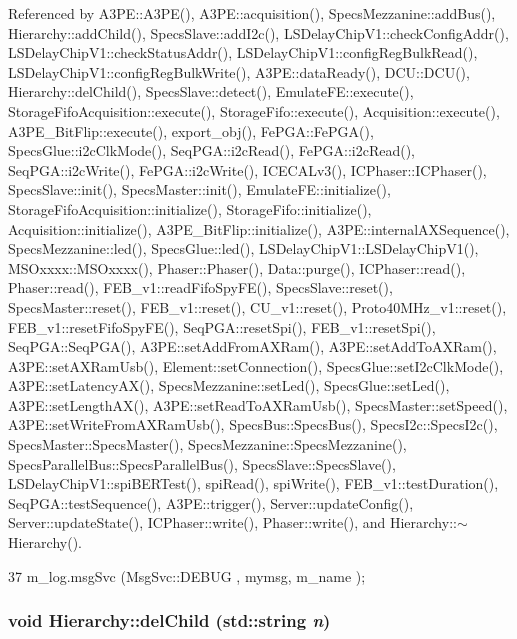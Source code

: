 Referenced by A3PE::A3PE(), A3PE::acquisition(), SpecsMezzanine::addBus(), Hierarchy::addChild(), SpecsSlave::addI2c(), LSDelayChipV1::checkConfigAddr(), LSDelayChipV1::checkStatusAddr(), LSDelayChipV1::configRegBulkRead(), LSDelayChipV1::configRegBulkWrite(), A3PE::dataReady(), DCU::DCU(), Hierarchy::delChild(), SpecsSlave::detect(), EmulateFE::execute(), StorageFifoAcquisition::execute(), StorageFifo::execute(), Acquisition::execute(), A3PE\_\-BitFlip::execute(), export\_\-obj(), FePGA::FePGA(), SpecsGlue::i2cClkMode(), SeqPGA::i2cRead(), FePGA::i2cRead(), SeqPGA::i2cWrite(), FePGA::i2cWrite(), ICECALv3(), ICPhaser::ICPhaser(), SpecsSlave::init(), SpecsMaster::init(), EmulateFE::initialize(), StorageFifoAcquisition::initialize(), StorageFifo::initialize(), Acquisition::initialize(), A3PE\_\-BitFlip::initialize(), A3PE::internalAXSequence(), SpecsMezzanine::led(), SpecsGlue::led(), LSDelayChipV1::LSDelayChipV1(), MSOxxxx::MSOxxxx(), Phaser::Phaser(), Data::purge(), ICPhaser::read(), Phaser::read(), FEB\_\-v1::readFifoSpyFE(), SpecsSlave::reset(), SpecsMaster::reset(), FEB\_\-v1::reset(), CU\_\-v1::reset(), Proto40MHz\_\-v1::reset(), FEB\_\-v1::resetFifoSpyFE(), SeqPGA::resetSpi(), FEB\_\-v1::resetSpi(), SeqPGA::SeqPGA(), A3PE::setAddFromAXRam(), A3PE::setAddToAXRam(), A3PE::setAXRamUsb(), Element::setConnection(), SpecsGlue::setI2cClkMode(), A3PE::setLatencyAX(), SpecsMezzanine::setLed(), SpecsGlue::setLed(), A3PE::setLengthAX(), A3PE::setReadToAXRamUsb(), SpecsMaster::setSpeed(), A3PE::setWriteFromAXRamUsb(), SpecsBus::SpecsBus(), SpecsI2c::SpecsI2c(), SpecsMaster::SpecsMaster(), SpecsMezzanine::SpecsMezzanine(), SpecsParallelBus::SpecsParallelBus(), SpecsSlave::SpecsSlave(), LSDelayChipV1::spiBERTest(), spiRead(), spiWrite(), FEB\_\-v1::testDuration(), SeqPGA::testSequence(), A3PE::trigger(), Server::updateConfig(), Server::updateState(), ICPhaser::write(), Phaser::write(), and Hierarchy::$\sim$Hierarchy().


\begin{DoxyCode}
37 { m_log.msgSvc (MsgSvc::DEBUG   , mymsg, m_name ); }
\end{DoxyCode}
\hypertarget{classHierarchy_a1928ac7615fe0b5e55cd707f70dc6781}{
\subsubsection[{delChild}]{\setlength{\rightskip}{0pt plus 5cm}void Hierarchy::delChild (std::string {\em n})}}
\label{classHierarchy_a1928ac7615fe0b5e55cd707f70dc6781}


